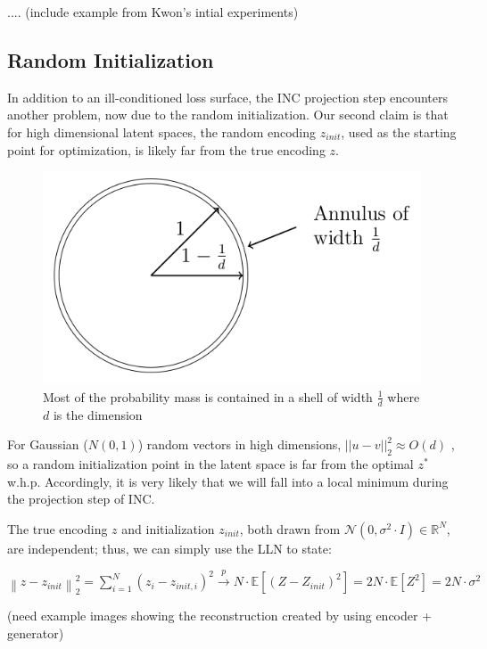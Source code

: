 \documentclass[twoside]{article}
\theoremstyle{definition}
\newcommand{\norm}[2]{\left\lVert #1 \right\rVert_{#2}}
\begin{document}
.... (include example from Kwon's intial experiments)

\subsection{Random Initialization}

In addition to an ill-conditioned loss surface, the INC projection step encounters another problem, now due to the random initialization. Our second claim is that for high dimensional latent spaces, the random encoding $z_{init}$, used as the starting point for optimization, is likely far from the true encoding $z$.

\begin{figure}[H]
    \caption{Most of the probability mass is contained in a shell of width $\frac{1}{d}$ where $d$ is the dimension}
    \centering
    \includegraphics[scale=0.3]{./shell.png}
\end{figure}

For Gaussian ($N(0, 1)$) random vectors in high dimensions, $||u - v||_2^2 \approx O(d)$ \cite{foundations}, so a random initialization point in the latent space is far from the optimal $z^*$ w.h.p. Accordingly, it is very likely that we will fall into a local minimum during the projection step of INC.

The true encoding $z$ and initialization $z_{init}$, both drawn from $\mathcal{N}(0,\sigma^2 \cdot I) \in \mathbb{R}^N$, are independent; thus, we can simply use the LLN to state:

$\norm{z-z_{init}}{2}^2 = \sum\limits_{i=1}^N (z_i-z_{init,i})^2 \overset{p}{\longrightarrow} N \cdot \mathbb{E}[(Z-Z_{init})^2]
= 2N \cdot \mathbb{E}[Z^2] = 2N \cdot \sigma^2$


(need example images showing the reconstruction created by using encoder + generator)
\end{document}
